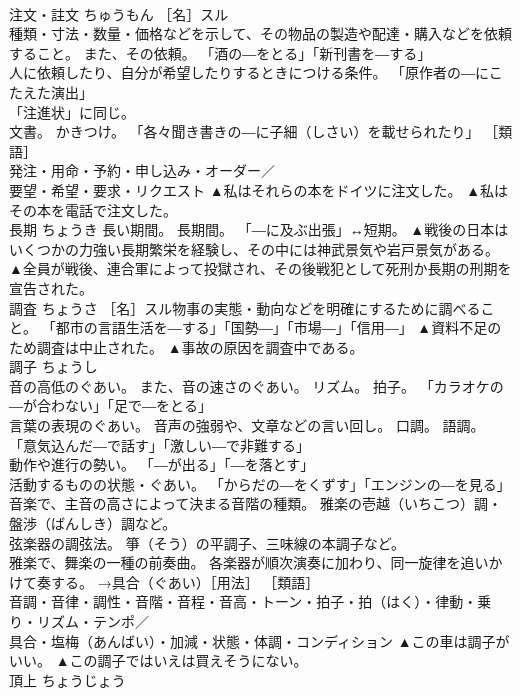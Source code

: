 \documentclass[8pt]{extreport}
\begin{document}
\begin{CJK}{UTF8}{min}
\\	注文・註文	ちゅうもん	［名］スル 
\\	種類・寸法・数量・価格などを示して、その物品の製造や配達・購入などを依頼すること。 また、その依頼。 「酒の―をとる」「新刊書を―する」 
\\	人に依頼したり、自分が希望したりするときにつける条件。 「原作者の―にこたえた演出」 
\\	「注進状」に同じ。 
\\	文書。 かきつけ。 「各々聞き書きの―に子細（しさい）を載せられたり」 ［類語］
\\	発注・用命・予約・申し込み・オーダー／
\\	要望・希望・要求・リクエスト	▲私はそれらの本をドイツに注文した。 ▲私はその本を電話で注文した。
\\	長期	ちょうき	長い期間。 長期間。 「―に及ぶ出張」↔短期。	▲戦後の日本はいくつかの力強い長期繁栄を経験し、その中には神武景気や岩戸景気がある。 ▲全員が戦後、連合軍によって投獄され、その後戦犯として死刑か長期の刑期を宣告された。
\\	調査	ちょうさ	［名］スル物事の実態・動向などを明確にするために調べること。 「都市の言語生活を―する」「国勢―」「市場―」「信用―」	▲資料不足のため調査は中止された。 ▲事故の原因を調査中である。
\\	調子	ちょうし	
\\	音の高低のぐあい。 また、音の速さのぐあい。 リズム。 拍子。 「カラオケの―が合わない」「足で―をとる」 
\\	言葉の表現のぐあい。 音声の強弱や、文章などの言い回し。 口調。 語調。 「意気込んだ―で話す」「激しい―で非難する」 
\\	動作や進行の勢い。 「―が出る」「―を落とす」 
\\	活動するものの状態・ぐあい。 「からだの―をくずす」「エンジンの―を見る」 
\\	音楽で、主音の高さによって決まる音階の種類。 雅楽の壱越（いちこつ）調・盤渉（ばんしき）調など。 
\\	弦楽器の調弦法。 箏（そう）の平調子、三味線の本調子など。 
\\	雅楽で、舞楽の一種の前奏曲。 各楽器が順次演奏に加わり、同一旋律を追いかけて奏する。 →具合（ぐあい）［用法］ ［類語］
\\	音調・音律・調性・音階・音程・音高・トーン・拍子・拍（はく）・律動・乗り・リズム・テンポ／
\\	具合・塩梅（あんばい）・加減・状態・体調・コンディション	▲この車は調子がいい。 ▲この調子ではいえは買えそうにない。
\\	頂上	ちょうじょう	

\end{CJK}
\end{document}

